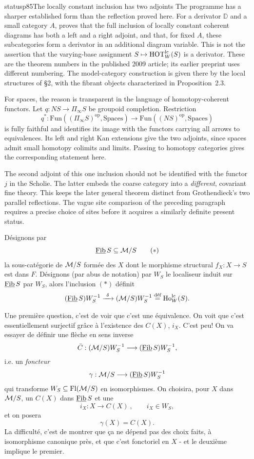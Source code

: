 \begin{dcomment}{status}{p85}{The locally constant inclusion has two adjoints}
The programme has a sharper established form than the reflection proved here. For a derivator $\mathbb D$ and a small category $A$, \citet[Proposition~3.10 and Theorem~3.13]{Cisinski2009LocallyConstant} proves that the full inclusion of locally constant coherent diagrams has both a left and a right adjoint, and that, for fixed $A$, these subcategories form a derivator in an additional diagram variable. This is not the assertion that the varying-base assignment $S\mapsto\mathrm{HOT}_W^{\mathrm{lc}}(S)$ is a derivator. These are the theorem numbers in the published 2009 article; its earlier preprint uses different numbering. The model-category construction is given there by the local structures of \S2, with the fibrant objects characterized in Proposition~2.3.

For spaces, the reason is transparent in the language of homotopy-coherent functors. Let $q:NS\to\Pi_\infty S$ be groupoid completion. Restriction
\[
 q^*:\mathrm{Fun}((\Pi_\infty S)^{\mathrm{op}},\mathrm{Spaces})
       \longrightarrow\mathrm{Fun}((NS)^{\mathrm{op}},\mathrm{Spaces})
\]
is fully faithful and identifies its image with the functors carrying all arrows to equivalences. Its left and right Kan extensions give the two adjoints, since spaces admit small homotopy colimits and limits. Passing to homotopy categories gives the corresponding statement here.

The second adjoint of this one inclusion should not be identified with the functor $j$ in the Scholie. The latter embeds the coarse category into a \emph{different}, covariant fine theory. This keeps the later general theorem distinct from Grothendieck's two parallel reflections. The vague site comparison of the preceding paragraph requires a precise choice of sites before it acquires a similarly definite present status.
\end{dcomment}


Désignons par
\[
\underline{\mathrm{Fib}}\, S\subseteq\mathcal{M}/S \tag*{$(*)$}
\]
la sous-catégorie de $\mathcal{M}/S$ formée des $X$ dont le morphisme structural $f_X:X\longrightarrow S$ est
dans $F$. Désignons (par abus de notation) par $W_S$ le localiseur induit sur $\underline{\mathrm{Fib}}\, S$ par $W_S$,
alors l'inclusion $(*)$ définit
\[
(\Fib S)W_S^{-1}\xrightarrow{\ \delta\ }(\cM/S)W_S^{-1}\overset{\text{déf}}{=}\Ho^{\mathrm{lc}}_W(S).
\]

Une première question, c'est de voir que c'est une équivalence. On voit que c'est essentiellement
surjectif grâce à l'existence des $C(X)$, $i_X$. C'est peu! On va essayer de définir
une flèche en sens inverse
\[
\bar{C}:(\mathcal{M}/S)W_S^{-1}\longrightarrow(\underline{\mathrm{Fib}}\, S)W_S^{-1},
\]
i.e. un \textit{foncteur}
\[
\gamma:\mathcal{M}/S\longrightarrow(\underline{\mathrm{Fib}}\, S)W_S^{-1}
\]
qui transforme $W_S\subseteq\mathrm{Fl}(\mathcal{M}/S)$ en isomorphismes. On choisira, pour $X$ dans $\mathcal{M}/S$, un
$C(X)$ dans $\underline{\mathrm{Fib}}\, S$ et une
\[
i_X:X\longrightarrow C(X)\ , \qquad i_X\in W_S,
\]
et on posera
\[
\gamma(X)=C(X).
\]
La difficulté, c'est de montrer que ça ne dépend pas des choix faits, à isomorphisme
canonique près, et que c'est fonctoriel en $X$ - et le deuxième implique le premier.

